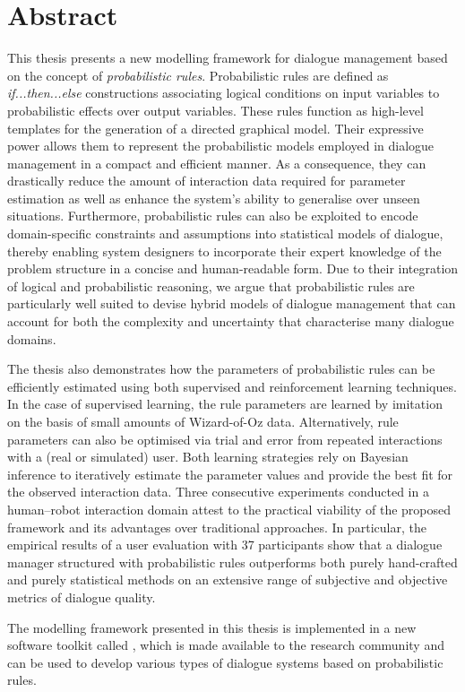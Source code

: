 \chapter*{Abstract}

This thesis presents a new modelling framework for dialogue management based on the concept of \textit{probabilistic rules}.  Probabilistic rules are defined as \textit{if...then...else} constructions associating logical conditions on input variables to probabilistic effects over output variables.  These rules function as high-level templates for the generation of a directed graphical model. Their expressive power allows them to represent the probabilistic models employed in dialogue management in a compact and efficient manner. As a consequence, they can drastically reduce the amount of interaction data required for parameter estimation as well as enhance the system's ability to generalise over unseen situations. Furthermore, probabilistic rules can also be exploited to encode domain-specific constraints and assumptions into statistical models of dialogue, thereby enabling system designers to incorporate their expert knowledge of the problem structure in a concise and human-readable form.  Due to their integration of logical and probabilistic reasoning, we argue that probabilistic rules are particularly well suited to devise hybrid models of dialogue management that can account for both the complexity and uncertainty that characterise many dialogue domains.

The thesis also demonstrates how the parameters of probabilistic rules can be efficiently estimated using both supervised and reinforcement learning techniques. In the case of supervised learning, the rule parameters are learned by imitation on the basis of small amounts of Wizard-of-Oz data.  Alternatively, rule parameters can also be optimised via trial and error from repeated interactions with a (real or simulated) user. Both learning strategies rely on Bayesian inference to iteratively estimate the parameter values and provide the best fit for the observed interaction data. Three consecutive experiments conducted in a human--robot interaction domain attest to the practical viability of the proposed framework and its advantages over traditional approaches.  In particular, the empirical results of a user evaluation with 37 participants show that a dialogue manager structured with probabilistic rules outperforms both purely hand-crafted and purely statistical methods on an extensive range of subjective and objective metrics of dialogue quality.

The modelling framework presented in this thesis is implemented in a new software toolkit called \opendial{}, which is made available to the research community and can be used to develop various types of dialogue systems based on probabilistic rules. 
